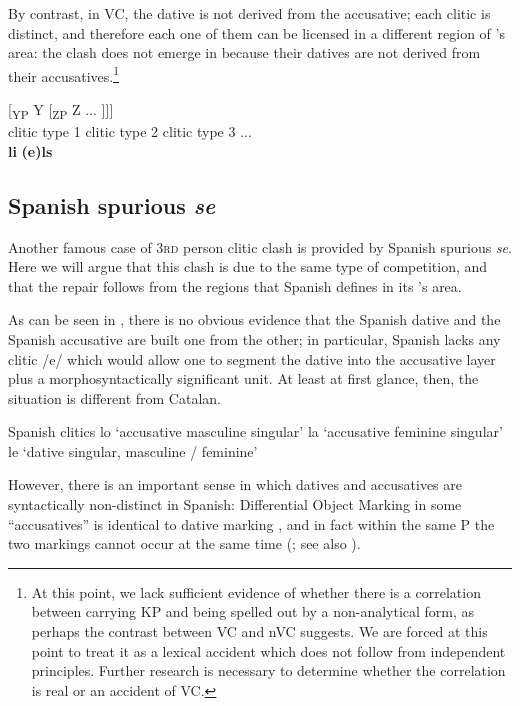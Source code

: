 \documentclass[output=paper,modfonts,nonflat,newtxmath,colorlinks,citecolor=brown]{langsci/langscibook}
\begin{document}
    \z

By contrast, in VC, the dative is not derived from the accusative; each clitic is distinct, and therefore each one of them can be licensed in a different region of \citeauthor{Sportiche1996}’s area: the clash does not emerge in  because their datives are not derived from their accusatives.\footnote{At this point, we lack sufficient evidence of whether there is a correlation between carrying KP and being spelled out by a non-analytical form, as perhaps the contrast between VC and nVC suggests. We are forced at this point to treat it as a lexical accident which does not follow from independent principles. Further research is necessary to determine whether the correlation is real or an accident of VC.}

\ea%
    \label{ex:cabre:17}
    \gll {[\textsubscript{XP} X} { } {[\textsubscript{YP} Y} { } {[\textsubscript{ZP}  Z} ...  ]]]\\
    \footnotesize {clitic type 1} { } \footnotesize {clitic type 2} { }  \footnotesize   {clitic type 3} ...\\
    \glt \textbf{li} \textbf{(e)ls}
	\z

\subsection{Spanish spurious \textit{se}}
\label{sec:cabre:3.2}

An\-\-\-other famous case of \textsc{3rd} person clitic clash is provided by Spanish spurious \textit{se}. Here we will argue that this clash is due to the same type of competition, and that the repair follows from the regions that Spanish defines in its \citeauthor{Sportiche1996}’s area.

As can be seen in , there is no obvious evidence that the Spanish dative and the Spanish accusative are built one from the other; in particular, Spanish lacks any clitic /e/ which would allow one to segment the dative into the accusative layer plus a morphosyntactically significant unit. At least at first glance, then, the situation is different from Catalan.

\ea%
	 Spanish clitics
    \label{ex:cabre:18}
    \ea lo ‘accusative masculine singular’
    \ex la ‘accusative feminine singular’
    \ex le ‘dative singular, masculine / feminine’
    \z
    \z



However, there is an important sense in which datives and accusatives are syntactically non-distinct in Spanish: Differential Object Marking in some ``accusatives'' is identical to dative marking , and in fact within the same \liv P the two markings cannot occur at the same time  (\citealt{OrmazabalRomero2013Probus}; see also ).
\end{document}
